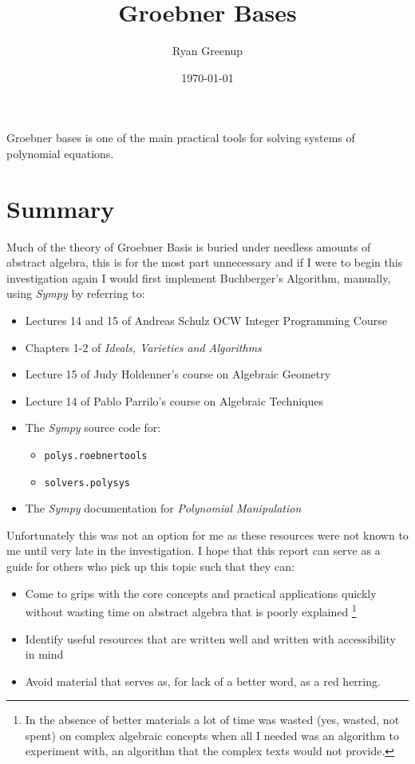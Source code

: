 \documentclass[a4paper,11pt,twoside]{article}
\author{Ryan Greenup}
\date{\today}
\title{Groebner Bases}
\begin{document}
\maketitle

Groebner bases is one of the main practical tools for solving systems
of polynomial equations.

\section{Summary}
\label{sec:orgc856d76}
Much of the theory of Groebner Basis is buried under needless
amounts of abstract algebra, this is for the most part unnecessary
and if I were to begin this investigation again I would first
implement Buchberger's Algorithm, manually, using \emph{Sympy} by referring to:

\begin{itemize}
\item Lectures 14 and 15 of Andreas Schulz OCW Integer Programming
Course \cite{andreasschulzIntegerProgrammingCombinatorial}
\item Chapters 1-2 of \emph{Ideals, Varieties and Algorithms} \cite{coxIdealsVarietiesAlgorithms1997}
\item Lecture 15 of Judy Holdenner's course on Algebraic Geometry \cite{judyholdenerAlgebraicGeometry2013}
\item Lecture 14 of Pablo Parrilo's course on Algebraic Techniques \cite{pabloparriloAlgebraicTechniquesSemidefinite}
\item The \emph{Sympy} source code for:
\begin{itemize}
\item \texttt{polys.roebnertools} \cite{sympydevelopmentteamSympyPolysGroebnertools}
\item \texttt{solvers.polysys} \cite{sympydevelopmentteamSympySolversPolysys}
\end{itemize}
\item The \emph{Sympy} documentation for \emph{Polynomial Manipulation} \cite{sympydevelopmentteamGrobnerBasesTheir2021}
\end{itemize}

Unfortunately this was not an option for me as these resources were
not known to me until very late in the investigation. I hope that
this report can serve as a guide for others who pick up this topic
such that they can:

\begin{itemize}
\item Come to grips with the core concepts and practical applications
quickly without wasting time on abstract algebra that is poorly
explained \footnote{In the absence of better materials a lot of time was wasted
(yes, wasted, not spent) on complex algebraic concepts when all I
needed was an algorithm to experiment with, an algorithm that the
complex texts would not provide.}
\item Identify useful resources that are written well and written with
accessibility in mind
\item Avoid material that serves as, for lack of a better word, as a
red herring.
\end{itemize}
\end{document}
